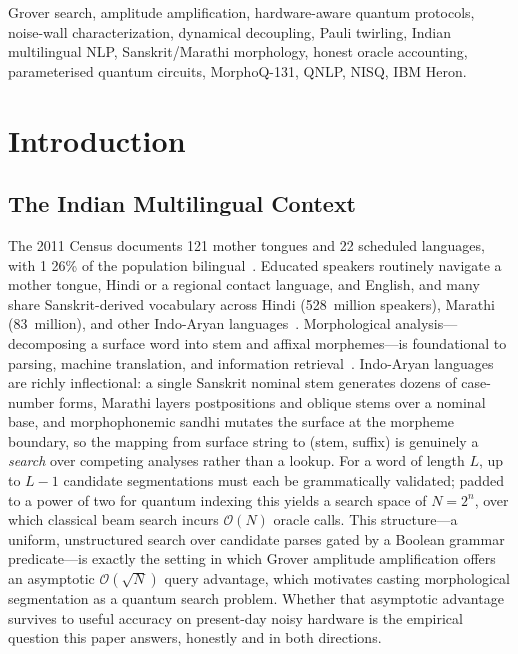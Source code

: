 \documentclass[journal]{IEEEtran}
\newcommand{\bigO}{\mathcal{O}}
\newcommand{\sqrtN}{\sqrt{N}}
\begin{document}
\begin{IEEEkeywords}
Grover search, amplitude amplification, hardware-aware quantum protocols,
noise-wall characterization, dynamical decoupling, Pauli twirling, Indian
multilingual NLP, Sanskrit/Marathi morphology, honest oracle accounting,
parameterised quantum circuits, MorphoQ-131, QNLP, NISQ, IBM Heron.
\end{IEEEkeywords}

\section{Introduction}

\subsection{The Indian Multilingual Context}
The 2011 Census documents 121 mother tongues and 22 scheduled languages, with 1
26\% of the population bilingual~\cite{census2011}. Educated speakers routinely
navigate a mother tongue, Hindi or a regional contact language, and English,
and many share Sanskrit-derived vocabulary across Hindi (528~million speakers),
Marathi (83~million), and other Indo-Aryan languages~\cite{ethnologue2023}.
Morphological analysis---decomposing a surface word into stem and affixal
morphemes---is foundational to parsing, machine translation, and information
retrieval~\cite{goldberg2017,bharati1995}. Indo-Aryan languages are richly
inflectional: a single Sanskrit nominal stem generates dozens of case-number
forms, Marathi layers postpositions and oblique stems over a nominal base, and
morphophonemic sandhi mutates the surface at the morpheme boundary, so the
mapping from surface string to (stem, suffix) is genuinely a \emph{search} over
competing analyses rather than a lookup. For a word of length $L$, up to
$L\!-\!1$ candidate segmentations must each be grammatically validated; padded to
a power of two for quantum indexing this yields a search space of $N=2^{n}$, over
which classical beam search incurs $\bigO(N)$ oracle calls. This structure---a
uniform, unstructured search over candidate parses gated by a Boolean grammar
predicate---is exactly the setting in which Grover amplitude amplification offers
an asymptotic $\bigO(\sqrtN)$ query advantage, which motivates casting
morphological segmentation as a quantum search problem. Whether that asymptotic
advantage survives to useful accuracy on present-day noisy hardware is the
empirical question this paper answers, honestly and in both directions.
\end{document}

